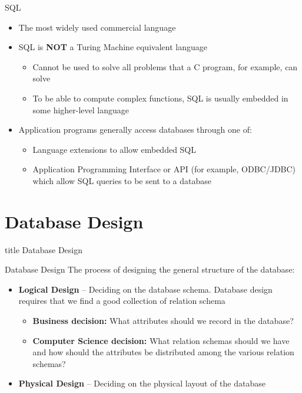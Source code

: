 \documentclass[aspectratio=169, xcolor=dvipsnames]{beamer}
\begin{document}
\begin{frame}{SQL}
    \begin{itemize}[<+->]
        \item The most widely used commercial language
        \item SQL is \textbf{NOT} a Turing Machine equivalent language
        \begin{itemize}
            \item Cannot be used to solve all problems that a C program, for example, can solve
            \item To be able to compute complex functions, SQL is usually embedded in some higher-level language
        \end{itemize}
        \item Application programs generally access databases through one of:
        \begin{itemize}
            \item Language extensions to allow embedded SQL
            \item Application Programming Interface or API (for example, ODBC/JDBC) which allow SQL queries to be sent to a database
        \end{itemize}
    \end{itemize}
\end{frame}

\section{Database Design}

\begin{frame}
  \vfill
  \centering
  \begin{beamercolorbox}[sep=8pt,center,shadow=true,rounded=true]{title}
    Database Design\par%
  \end{beamercolorbox}
  \vfill
\end{frame}

\begin{frame}{Database Design}
    The process of designing the general structure of the database:
    \begin{itemize}[<+->]
        \item \textbf{Logical Design} -- Deciding on the database schema. Database design requires that we find a good collection of relation schema
        \begin{itemize}
            \item \textbf{Business decision:} What attributes should we record in the database?
            \item \textbf{Computer Science decision:} What relation schemas should we have and how should the attributes be distributed among the various relation schemas?
        \end{itemize}
        \item \textbf{Physical Design} -- Deciding on the physical layout of the database
    \end{itemize}
\end{frame}
\end{document}
